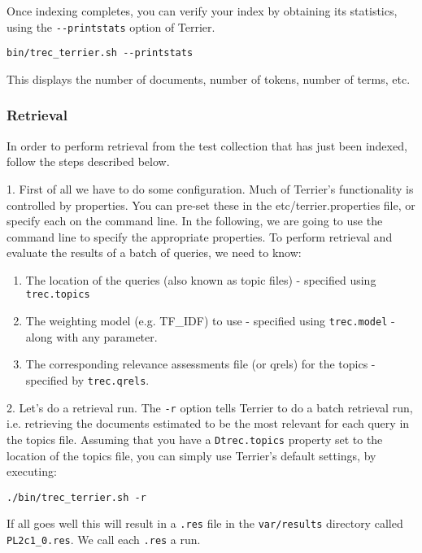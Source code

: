Once indexing completes, you can verify your index by obtaining its
statistics, using the \texttt{-\/-printstats} option of Terrier.

\begin{verbatim}
bin/trec_terrier.sh --printstats
\end{verbatim}

This displays the number of documents, number of tokens, number of
terms, etc.

\subsubsection{Retrieval}\label{retrieval}

In order to perform retrieval from the test collection that has just
been indexed, follow the steps described below.

1. First of all we have to do some configuration. Much of Terrier's
functionality is controlled by properties. You can pre-set these in the
etc/terrier.properties file, or specify each on the command line. In the
following, we are going to use the command line to specify the
appropriate properties. To perform retrieval and evaluate the results of
a batch of queries, we need to know:

\begin{enumerate}
\def\labelenumi{\roman{enumi}.}
\tightlist
\item
  The location of the queries (also known as topic files) - specified
  using \texttt{trec.topics}
\item
  The weighting model (e.g. TF\_IDF) to use - specified using
  \texttt{trec.model} - along with any parameter.
\item
  The corresponding relevance assessments file (or qrels) for the topics
  - specified by \texttt{trec.qrels}.
\end{enumerate}

2. Let's do a retrieval run. The \texttt{-r} option tells Terrier to do
a batch retrieval run, i.e. retrieving the documents estimated to be the
most relevant for each query in the topics file. Assuming that you have
a \texttt{Dtrec.topics} property set to the location of the topics file,
you can simply use Terrier's default settings, by executing:

\begin{verbatim}
./bin/trec_terrier.sh -r
\end{verbatim}

If all goes well this will result in a \texttt{.res} file in the
\texttt{var/results} directory called \texttt{PL2c1\_0.res}. We call
each \texttt{.res} a run.

